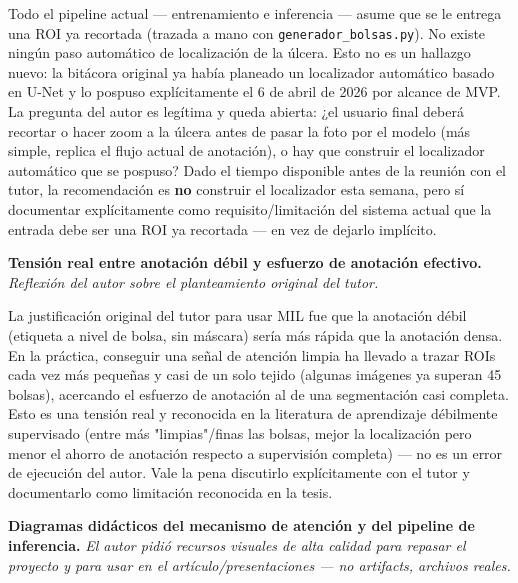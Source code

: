 \documentclass[12pt,letterpaper]{report}
\newcommand{\entrada}[2]{%
    \vspace{0.6em}
    \noindent\textbf{#1.} \textit{#2}
    \vspace{0.3em}
    \par
}
\begin{document}
Todo el pipeline actual --- entrenamiento e inferencia --- asume que se le entrega una ROI ya
recortada (trazada a mano con \texttt{generador\_bolsas.py}). No existe ningún paso automático de
localización de la úlcera. Esto no es un hallazgo nuevo: la bitácora original ya había planeado un
localizador automático basado en U-Net y lo pospuso explícitamente el 6 de abril de 2026 por
alcance de MVP. La pregunta del autor es legítima y queda abierta: ¿el usuario final deberá recortar
o hacer zoom a la úlcera antes de pasar la foto por el modelo (más simple, replica el flujo actual
de anotación), o hay que construir el localizador automático que se pospuso? Dado el tiempo
disponible antes de la reunión con el tutor, la recomendación es \textbf{no} construir el
localizador esta semana, pero sí documentar explícitamente como requisito/limitación del sistema
actual que la entrada debe ser una ROI ya recortada --- en vez de dejarlo implícito.

\entrada{Tensión real entre anotación débil y esfuerzo de anotación efectivo}{Reflexión del autor
sobre el planteamiento original del tutor.}

La justificación original del tutor para usar MIL fue que la anotación débil (etiqueta a nivel de
bolsa, sin máscara) sería más rápida que la anotación densa. En la práctica, conseguir una señal de
atención limpia ha llevado a trazar ROIs cada vez más pequeñas y casi de un solo tejido (algunas
imágenes ya superan 45 bolsas), acercando el esfuerzo de anotación al de una segmentación casi
completa. Esto es una tensión real y reconocida en la literatura de aprendizaje débilmente
supervisado (entre más "limpias"/finas las bolsas, mejor la localización pero menor el ahorro de
anotación respecto a supervisión completa) --- no es un error de ejecución del autor. Vale la pena
discutirlo explícitamente con el tutor y documentarlo como limitación reconocida en la tesis.

\entrada{Diagramas didácticos del mecanismo de atención y del pipeline de inferencia}{El autor pidió
recursos visuales de alta calidad para repasar el proyecto y para usar en el artículo/presentaciones
--- no artifacts, archivos reales.}
\end{document}
